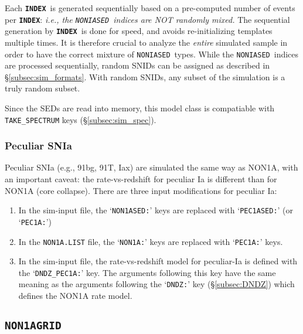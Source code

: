 \documentclass[12pt]{article}
\newcommand{\NONIA}{{\tt NONIASED}}
\newcommand{\indx}{{\bf\tt INDEX}}
\begin{document}
Each \indx\ is generated sequentially based on a pre-computed number
of events per \indx:
{\it i.e., the \NONIA\ indices are NOT randomly mixed.}
The sequential generation by \indx\ is done for speed,
and avoids re-initializing templates multiple times.
It is therefore crucial to analyze the {\it entire}
simulated sample in order to have the correct mixture
of \NONIA\ types.
While the \NONIA\ indices are processed sequentially,
random SNIDs can be assigned as described in   
\S\ref{subsec:sim_formats}. With random SNIDs,
any subset of the simulation is a truly random subset.

Since the SEDs are read into memory, this model class is compatiable
with {\tt TAKE\_SPECTRUM} keys (\S\ref{subsec:sim_spec}).

\subsubsection{Peculiar SNIa}
\label{sss:pec1a}

Peculiar SNIa (e.g., 91bg, 91T, Iax) are simulated the
same way as NON1A, with an important caveat:
the rate-vs-redshift for peculiar Ia is different than
for NON1A (core collapse).
There are three input modifications for peculiar Ia:
%
\begin{enumerate}
   \item In the sim-input file, the `{\tt NON1ASED:}' keys are replaced
         with `{\tt PEC1ASED:}' (or `{\tt PEC1A:}') 
   \item In the {\tt NON1A.LIST} file, the `{\tt NON1A:}' keys are 
          replaced with `{\tt PEC1A:}'  keys.
   \item In the sim-input file, the rate-vs-redshift model 
         for peculiar-Ia is defined with the `{\tt DNDZ\_PEC1A:}' key. 
         The arguments
         following this key have the same meaning as the
         arguments following the `{\tt DNDZ:}' key 
         (\S\ref{subsec:DNDZ}) which defines the NON1A rate model.
\end{enumerate}


\subsection{\tt NON1AGRID}
\label{subsec:NON1AGRID}
\end{document}
